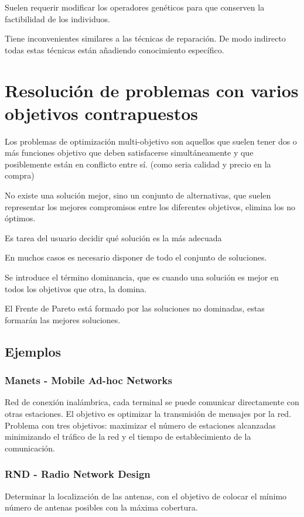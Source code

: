 \documentclass[12pt, twoside, openright]{report} %
\begin{document}
Suelen requerir modificar los operadores genéticos para que conserven la factibilidad de los individuos.

Tiene inconvenientes similares a las técnicas de reparación. De modo indirecto todas estas técnicas están añadiendo conocimiento específico.

\section{Resolución de problemas con varios objetivos contrapuestos}
Los problemas de optimización multi-objetivo son aquellos que suelen tener dos o más funciones objetivo que deben satisfacerse simultáneamente y que posiblemente están en conflicto entre sí. (como seria calidad y precio en la compra)

No existe una solución mejor, sino un conjunto de alternativas, que suelen representar los mejores compromisos entre los diferentes objetivos, elimina los no óptimos.

Es tarea del usuario decidir qué solución es la más adecuada

En muchos casos es necesario disponer de todo el conjunto de soluciones.

Se introduce el término dominancia, que es cuando una solución es mejor en todos los objetivos que otra, la domina.

El Frente de Pareto está formado por las soluciones no dominadas, estas formarán las mejores soluciones.

\subsection{Ejemplos}
\subsubsection{Manets - Mobile Ad-hoc Networks} 
Red de conexión inalámbrica, cada terminal se puede comunicar directamente con otras estaciones. El objetivo es optimizar la transmisión de mensajes por la red. Problema con tres objetivos: maximizar el número de estaciones alcanzadas minimizando el tráfico de la red y el tiempo de establecimiento de la comunicación.

\subsubsection{RND - Radio Network Design} 
Determinar la localización de las antenas, con el objetivo de colocar el mínimo número de antenas posibles con la máxima cobertura.
\end{document}
